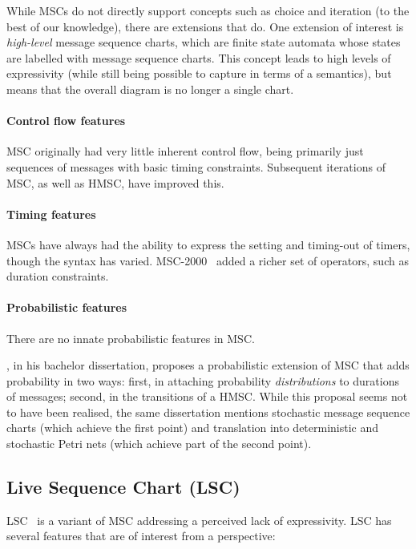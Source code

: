 While MSCs do not directly support concepts such as choice and iteration
(to the best of our knowledge), there are extensions that do.  One extension
of interest is \emph{high-level} message sequence charts, which are finite state
automata whose states are labelled with message sequence charts.  This concept
leads to high levels of expressivity (while still being possible to capture in
terms of a semantics), but means that the overall diagram is no longer a single
chart.

\paragraph{Control flow features}
MSC originally had very little inherent control flow, being primarily just
sequences of messages with basic timing constraints.  Subsequent iterations
of MSC, as well as HMSC, have improved this.

\paragraph{Timing features}
MSCs have always had the ability to express the setting and timing-out of
timers, though the syntax has varied.  MSC-2000~\cite{Haugen01-MSC2000} added a richer set of operators,
such as duration constraints.

\paragraph{Probabilistic features}
There are no innate probabilistic features in MSC.

\textcite{Krivanek09-PMSC}, in his bachelor dissertation, proposes a
probabilistic extension of MSC that adds probability in two
ways: first, in attaching probability \emph{distributions} to
durations of messages; second, in the transitions of a HMSC.  While
this proposal seems not to have been realised, the same
dissertation mentions stochastic message sequence charts (which
achieve the first point) and translation into deterministic and
stochastic Petri nets (which achieve part of the second point).

\subsection{Live Sequence Chart (LSC)}

LSC~\cite{lsc} is a
variant of MSC addressing a perceived lack of expressivity.
LSC has several features that are of interest from a \langname{} perspective:

